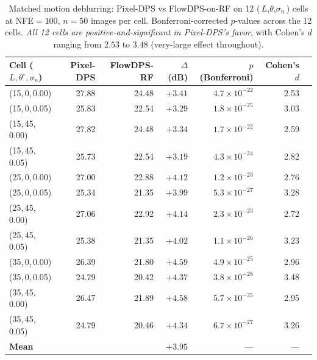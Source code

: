 \documentclass{article}
\begin{document}
\begin{table}[h]
  \centering
  \caption{Matched motion deblurring: Pixel-DPS vs FlowDPS-on-RF on
    12 (\,$L$,$\theta$,$\sigma_n$\,) cells at NFE${=}100$, $n{=}50$
    images per cell. Bonferroni-corrected $p$-values across the 12
    cells. \emph{All 12 cells are positive-and-significant in
    Pixel-DPS's favor}, with Cohen's $d$ ranging from $2.53$ to
    $3.48$ (very-large effect throughout).}
  \label{tab:matched_motion}
  \begin{tabular}{lrrrrrr}
    \toprule
    Cell ($L, \theta^\circ, \sigma_n$) & Pixel-DPS & FlowDPS-RF & $\Delta$ (dB) & $p$ (Bonferroni) & Cohen's $d$ \\
    \midrule
    (15,\,0,\,0.00)  & 27.88 & 24.48 & $+3.41$ & $4.7 \times 10^{-22}$ & 2.53 \\
    (15,\,0,\,0.05)  & 25.83 & 22.54 & $+3.29$ & $1.8 \times 10^{-25}$ & 3.03 \\
    (15,\,45,\,0.00) & 27.82 & 24.48 & $+3.34$ & $1.7 \times 10^{-22}$ & 2.59 \\
    (15,\,45,\,0.05) & 25.73 & 22.54 & $+3.19$ & $4.3 \times 10^{-24}$ & 2.82 \\
    (25,\,0,\,0.00)  & 27.00 & 22.88 & $+4.12$ & $1.2 \times 10^{-23}$ & 2.76 \\
    (25,\,0,\,0.05)  & 25.34 & 21.35 & $+3.99$ & $5.3 \times 10^{-27}$ & 3.28 \\
    (25,\,45,\,0.00) & 27.06 & 22.92 & $+4.14$ & $2.3 \times 10^{-23}$ & 2.72 \\
    (25,\,45,\,0.05) & 25.38 & 21.35 & $+4.02$ & $1.1 \times 10^{-26}$ & 3.23 \\
    (35,\,0,\,0.00)  & 26.39 & 21.80 & $+4.59$ & $4.9 \times 10^{-25}$ & 2.96 \\
    (35,\,0,\,0.05)  & 24.79 & 20.42 & $+4.37$ & $3.8 \times 10^{-28}$ & 3.48 \\
    (35,\,45,\,0.00) & 26.47 & 21.89 & $+4.58$ & $5.7 \times 10^{-25}$ & 2.95 \\
    (35,\,45,\,0.05) & 24.79 & 20.46 & $+4.34$ & $6.7 \times 10^{-27}$ & 3.26 \\
    \midrule
    \textbf{Mean}    &       &       & $\boldsymbol{+3.95}$ & --- & --- \\
    \bottomrule
  \end{tabular}
\end{table}
\end{document}
